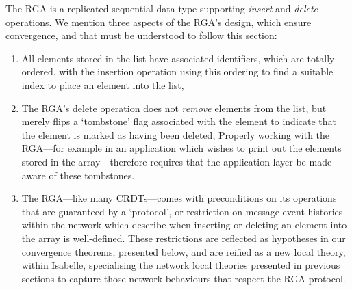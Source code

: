\documentclass[acmlarge,review,anonymous]{acmart}\settopmatter{printfolios=true}
\begin{document}
The RGA is a replicated sequential data type supporting \emph{insert} and \emph{delete} operations.
We mention three aspects of the RGA's design, which ensure convergence, and that must be understood to follow this section:
\begin{enumerate}
\item
All elements stored in the list have associated identifiers, which are totally ordered, with the insertion operation using this ordering to find a suitable index to place an element into the list,
\item
The RGA's delete operation does not \emph{remove} elements from the list, but merely flips a `tombstone' flag associated with the element to indicate that the element is marked as having been deleted,
Properly working with the RGA---for example in an application which wishes to print out the elements stored in the array---therefore requires that the application layer be made aware of these tombstones.
\item
The RGA---like many CRDTs---comes with preconditions on its operations that are guaranteed by a `protocol', or restriction on message event histories within the network which describe when inserting or deleting an element into the array is well-defined.
These restrictions are reflected as hypotheses in our convergence theorems, presented below, and are reified as a new local theory, within Isabelle, specialising the network local theories presented in previous sections to capture those network behaviours that respect the RGA protocol.
\end{enumerate}
\end{document}
